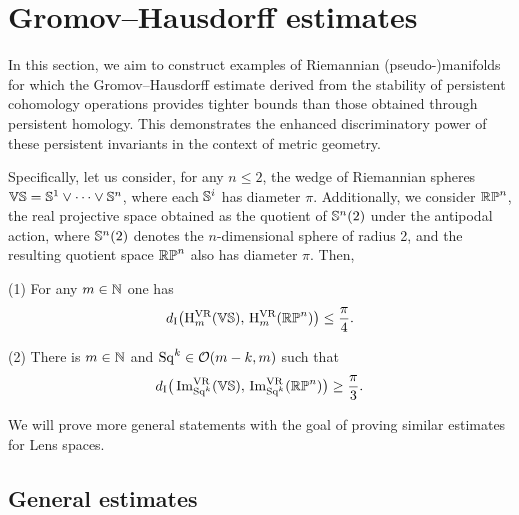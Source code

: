 
\section{Gromov--Hausdorff estimates}\label{prop:db estimate}

In this section, we aim to construct examples of Riemannian (pseudo-)manifolds for which the Gromov--Hausdorff estimate derived from the stability of persistent cohomology operations provides tighter bounds than those obtained through persistent homology.
This demonstrates the enhanced discriminatory power of these persistent invariants in the context of metric geometry.

Specifically, let us consider, for any \(n \leq 2\), the wedge of Riemannian spheres \(\mathbb{V}\mathbb{S} = \mathbb{S}^1 \vee \dots \vee \mathbb{S}^n\), where each \(\mathbb{S}^i\) has diameter \(\pi\).
Additionally, we consider \(\mathbb{RP}^n\), the real projective space obtained as the quotient of \(\mathbb{S}^n(2)\) under the antipodal action, where \(\mathbb{S}^n(2)\) denotes the \(n\)-dimensional sphere of radius 2, and the resulting quotient space \(\mathbb{RP}^n\) also has diameter \(\pi\).
Then,

\medskip (1) For any \(m \in \mathbb{N}\) one has
\[
d_{\mathrm{I}}\big(\mathrm{H}^{\mathrm{VR}}_m(\mathbb{V}\mathbb{S}),\, \mathrm{H}^{\mathrm{VR}}_m(\mathbb{RP}^n)\big) \leq \frac{\pi}{4}.
\]

(2) There is \(m \in \mathbb{N}\) and \(\operatorname{Sq}^k \in \mathcal{O}(m-k, m)\) such that
\[
d_{\mathrm{I}}\big(\operatorname{Im}_{\operatorname{Sq}^k}^{\mathrm{VR}}(\mathbb{V}\mathbb{S}),\, \operatorname{Im}_{\operatorname{Sq}^k}^{\mathrm{VR}}(\mathbb{RP}^n)\big) \geq \frac{\pi}{3}.
\]

We will prove more general statements with the goal of proving similar estimates for Lens spaces.


\subsection{General estimates}

